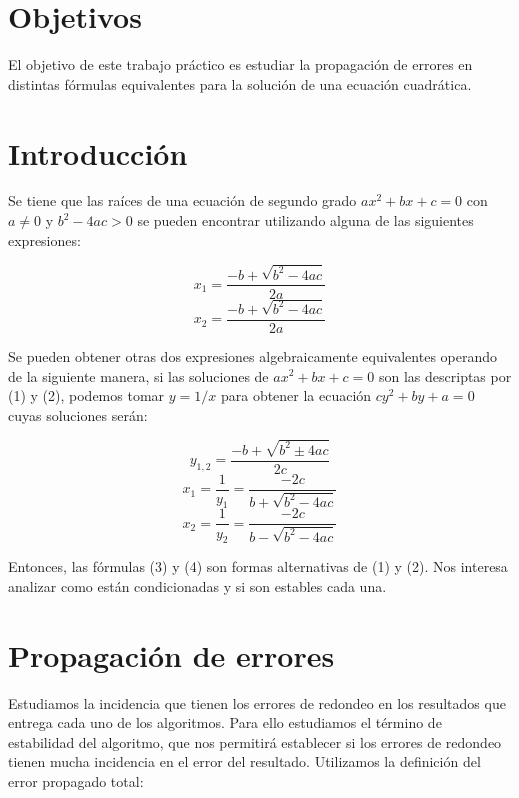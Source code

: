 \documentclass[a4paper, 10pt, spanish]{article}
\begin{document}
%
%
\tableofcontents
\newpage

%
%
\section{Objetivos}
El objetivo de este trabajo práctico es estudiar la propagación de errores en distintas fórmulas equivalentes para la solución de una ecuación cuadrática.

\section{Introducción}
Se tiene que las raíces de una ecuación de segundo grado $ax^{2} + bx + c = 0$ con $a \neq 0$ y $b^{2} - 4ac > 0$ se pueden encontrar utilizando alguna de las siguientes expresiones:

\begin{equation}
x_{1} = \frac{-b + \sqrt{b^{2} - 4ac}}{2a}
\end{equation}
\begin{equation}
x_{2} = \frac{-b + \sqrt{b^{2} - 4ac}}{2a}
\end{equation}

Se pueden obtener otras dos expresiones algebraicamente equivalentes operando de la siguiente manera, si las soluciones de $ax^{2} + bx + c = 0$ son las descriptas por (1) y (2), podemos tomar $ y = 1/x $ para obtener la ecuación $cy^{2} + by + a = 0$ cuyas soluciones serán:

\begin{equation}
y_{1,2} = \frac{-b + \sqrt{b^{2} \pm 4ac}}{2c} \nonumber
\end{equation}
\begin{equation}
x_{1} = \frac{1}{y_{1}} = \frac{-2c}{b + \sqrt{b^{2}-4ac}} 
\end{equation}
\begin{equation}
x_{2} = \frac{1}{y_{2}} = \frac{-2c}{b - \sqrt{b^{2}-4ac}} 
\end{equation}

Entonces, las fórmulas (3) y (4) son formas alternativas de (1) y (2). Nos interesa analizar como están condicionadas y si son estables cada una.

\section{Propagación de errores}
Estudiamos la incidencia que tienen los errores de redondeo en los resultados que entrega cada uno de los algoritmos. Para ello estudiamos el término de estabilidad del algoritmo, que nos permitirá establecer si los errores de redondeo tienen mucha incidencia en el error del resultado. Utilizamos la definición del error propagado total:
\end{document}
